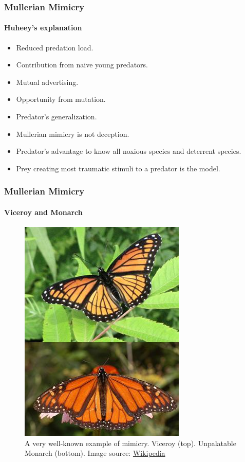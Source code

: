 \frame
{
	\frametitle{Mullerian Mimicry}
	\framesubtitle{Huheey's explanation}
	
	\begin{itemize}
		\item Reduced predation load.
		\item Contribution from naive young predators.
		\item Mutual advertising.
		\item Opportunity from mutation.
		\item Predator's generalization.
	\end{itemize}
	
	\begin{itemize}
		\item Mullerian mimicry is not deception.
		\item Predator's advantage to know all noxious species and deterrent species.
		\item Prey creating most traumatic stimuli to a predator is the model.
	\end{itemize}
}

\frame
{
	\frametitle{Mullerian Mimicry}
	\framesubtitle{Viceroy and Monarch}

	\begin{figure}[H]
		\centering
		\includegraphics[scale=0.5]{../tex/images/BatesMimButter}
		\caption{A very well-known example of mimicry. Viceroy (top). Unpalatable Monarch (bottom). Image source: \href{http://en.wikipedia.org/wiki/Mullerian_mimicry}{Wikipedia}}
		\label{fig:mullerian-butterfly}
	\end{figure}

}

